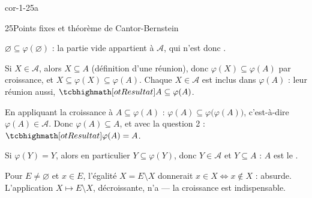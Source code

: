 
\begin{blocLivre}{cor-1-25a}
\begin{corrige}{25}{Points fixes et théorème de Cantor-Bernstein}
\begin{questions}
  \item $\varnothing\subseteq\varphi(\varnothing)$ : la partie vide
    appartient à $\mathcal{A}$, qui n'est donc .
  \item Si $X\in\mathcal{A}$, alors $X\subseteq A$ (définition d'une
    réunion), donc $\varphi(X)\subseteq\varphi(A)$ par croissance, et
    $X\subseteq\varphi(X)\subseteq\varphi(A)$. Chaque $X\in\mathcal{A}$
    est inclus dans $\varphi(A)$ : leur réunion aussi,
    $\res{A\subseteq\varphi(A)}$.
  \item En appliquant la croissance à $A\subseteq\varphi(A)$ :
    $\varphi(A)\subseteq\varphi\bigl(\varphi(A)\bigr)$, c'est-à-dire
    $\varphi(A)\in\mathcal{A}$. Donc $\varphi(A)\subseteq A$, et avec
    la question 2 : $\res{\varphi(A)=A}$.
  \item Si $\varphi(Y)=Y$, alors en particulier $Y\subseteq\varphi(Y)$,
    donc $Y\in\mathcal{A}$ et $Y\subseteq A$ : $A$ est le
    .
  \item Pour $E\neq\varnothing$ et $x\in E$, l'égalité $X=E\setminus X$
    donnerait $x\in X\iff x\notin X$ : absurde. L'application
    $X\mapsto E\setminus X$, décroissante, n'a  — la croissance est indispensable.
\end{questions}
\end{corrige}
\end{blocLivre}

